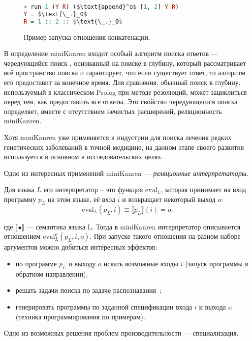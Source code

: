 \begin{figure}[h!]
\begin{lstlisting}[mathescape,language=Haskell,extendedchars=\true,frame=single,basicstyle=\ttfamily]
> run 1 (Y R) ($\text{append}^o$ [1, 2] Y R)
Y = $\text{\_.}_0$
R = 1 :: 2 :: $\text{\_.}_0$
\end{lstlisting}
\caption{Пример запуска отношения конкатенации.}
\label{fig:appendoExample}
\end{figure}

В определение miniKanren входит особый алгоритм поиска ответов --- чередующийся поиск ,
основанный на поиске в глубину, который рассматривает всё пространство поиска и гарантирует,
что если существует ответ, то алгоритм его предоставит за конечное время\cite{interleaving}.
Для сравнения, обычный поиск в глубину, используемый в классическом Prolog при методе резолюций, может зациклиться
перед тем, как предоставить все ответы. Это свойство чередующегося поиска определяет, вместе
с отсутствием нечистых расширений, реляционность miniKanren. 

Хотя miniKanren уже применяется в индустрии для поиска лечения редких генетических
заболеваний в точной медицине\cite{medMK},
на данном этапе своего развития используется в основном в исследовательских целях.

Одно из интересных применений miniKanren --- {\it реляционные интерпретаторы}.

Для языка $L$ его интерпретатор -- это функция $\text{eval}_L$, которая принимает
на вход программу $p_L$ на этом языке, её вход $i$ и возвращает некоторый выход $o$:
\[ \text{eval}_L (p_L, i) \equiv \llbracket p_L \rrbracket (i) = o,\]

где $\llbracket \bullet \rrbracket $ --- семантика языка L.
Тогда в miniKanren интерпретатор описывается отношением $\text{eval}^o_L(p_L, i, o)$.
При запуске такого отношения на разном наборе аргументов можно добиться интересных эффектов:
\begin{itemize}
\item по программе $p_L$ и выходу $o$ искать возможные входы $i$ (запуск программы в обратном направлении);
\item решать задачи поиска по задаче распознавания~\cite{lozov};
\item генерировать программы по заданной спецификации входа $i$ и выхода $o$
(техника программирования по примерам)\cite{unifiedMK}.
\end{itemize}


Одно из возможных решения проблем производительности --- специализация.
